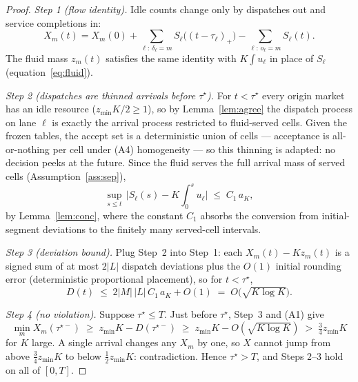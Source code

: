 \documentclass[10pt,a4paper]{amsart}
\begin{document}
\begin{proof}
\emph{Step 1 (flow identity).} Idle counts change only by dispatches
out and service completions in:
\begin{equation}
  X_m(t) = X_m(0)
  + \sum_{\ell:\, \delta_{\ell} = m} S_{\ell}\bigl( (t - \tau_{\ell})_+ \bigr)
  - \sum_{\ell:\, o_{\ell} = m} S_{\ell}(t).
\end{equation}
The fluid mass $z_m(t)$ satisfies the same identity with
$K \int u_{\ell}$ in place of $S_{\ell}$
(equation~\eqref{eq:fluid}).

\emph{Step 2 (dispatches are thinned arrivals before $\tau^{\star}$).}
For $t < \tau^{\star}$ every origin market has an idle resource
($z_{\min} K/2 \geq 1$), so by Lemma~\ref{lem:agree} the dispatch
process on lane $\ell$ is exactly the arrival process restricted to
fluid-served cells. Given the frozen tables, the accept set is a
deterministic union of cells --- acceptance is all-or-nothing per cell
under (A4) homogeneity --- so this thinning is adapted: no decision
peeks at the future. Since the fluid serves the full arrival mass of
served cells (Assumption~\ref{ass:sep}),
\begin{equation}
  \sup_{s \leq t}\,
  \bigl| S_{\ell}(s) - K \textstyle\int_0^s u_{\ell} \bigr|
  \;\leq\; C_1\, a_K,
\end{equation}
by Lemma~\ref{lem:conc}, where the constant $C_1$ absorbs the
conversion from initial-segment deviations to the finitely many
served-cell intervals.

\emph{Step 3 (deviation bound).} Plug Step~2 into Step~1: each
$X_m(t) - K z_m(t)$ is a signed sum of at most $2|L|$ dispatch
deviations plus the $O(1)$ initial rounding error (deterministic
proportional placement), so for $t < \tau^{\star}$,
\begin{equation}
  D(t) \;\leq\; 2 |M| \, |L| \, C_1\, a_K + O(1)
  \;=\; O\bigl( \sqrt{K \log K} \bigr).
\end{equation}

\emph{Step 4 (no violation).} Suppose $\tau^{\star} \leq T$. Just
before $\tau^{\star}$, Step~3 and (A1) give
\begin{equation}
  \min_m X_m(\tau^{\star-})
  \;\geq\; z_{\min} K - D(\tau^{\star-})
  \;\geq\; z_{\min} K - O(\sqrt{K \log K})
  \;>\; \tfrac{3}{4} z_{\min} K
\end{equation}
for $K$ large. A single arrival changes any
$X_m$ by one, so $X$ cannot jump from above
$\tfrac{3}{4} z_{\min} K$ to below $\tfrac{1}{2} z_{\min} K$:
contradiction. Hence $\tau^{\star} > T$, and Steps 2--3 hold on all of
$[0, T]$.
\end{proof}
\end{document}
